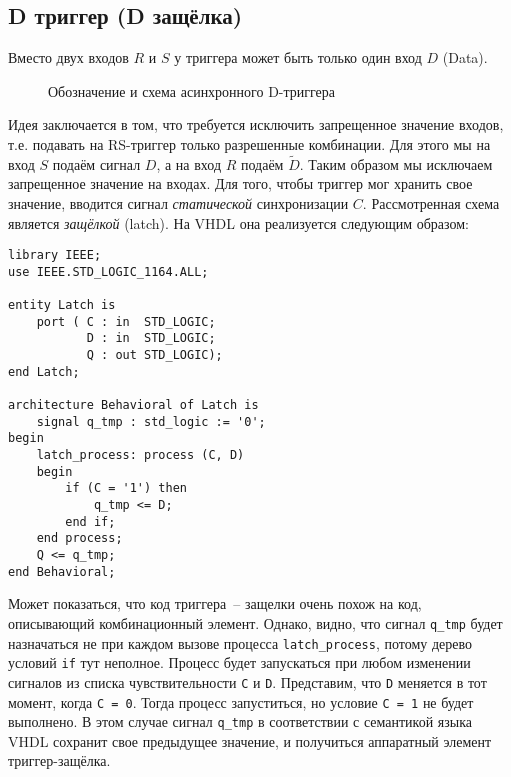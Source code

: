 \subsection{D триггер (D защёлка)}

Вместо двух входов $R$ и $S$ у триггера может быть только один вход $D$ (Data).

\begin{figure}[ht]
\centering
{}
\caption{Обозначение и схема асинхронного D-триггера}
\label{D_trigger_arch}
\end{figure}

Идея заключается в том, что требуется исключить запрещенное значение входов, т.е. подавать на RS-триггер только разрешенные комбинации. Для этого мы на вход $S$ подаём сигнал $D$, а на вход $R$ подаём $\tilde D$. Таким образом мы исключаем запрещенное значение на входах. Для того, чтобы триггер мог хранить свое значение, вводится сигнал \emph{статической} синхронизации $C$. Рассмотренная схема является \emph{защёлкой} (latch). На VHDL она реализуется следующим образом:

\begin{Code}
\begin{lstlisting}
library IEEE;
use IEEE.STD_LOGIC_1164.ALL;

entity Latch is
    port ( C : in  STD_LOGIC;
           D : in  STD_LOGIC;
           Q : out STD_LOGIC);
end Latch;

architecture Behavioral of Latch is
    signal q_tmp : std_logic := '0';
begin
    latch_process: process (C, D)
    begin
        if (C = '1') then
            q_tmp <= D;
        end if;
    end process;
    Q <= q_tmp;
end Behavioral;
\end{lstlisting}
\end{Code}

Может показаться, что код триггера~-- защелки очень похож на код, описывающий комбинационный элемент. Однако, видно, что сигнал \lstinline?q_tmp? будет назначаться не при каждом вызове процесса \lstinline?latch_process?, потому дерево условий \lstinline?if? тут неполное. Процесс будет запускаться при любом изменении сигналов из списка чувствительности \lstinline?С? и \lstinline?D?. Представим, что \lstinline?D? меняется в тот момент, когда \lstinline?С = 0?. Тогда процесс запуститься, но условие \lstinline?С = 1? не будет выполнено. В этом случае сигнал \lstinline?q_tmp? в соответствии с семантикой языка VHDL сохранит свое предыдущее значение, и получиться аппаратный элемент триггер-защёлка. 

